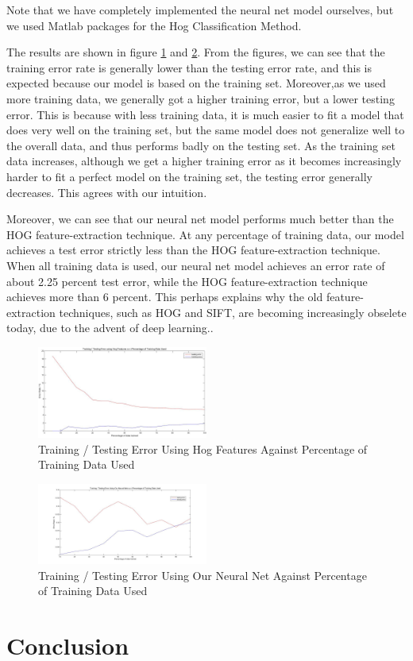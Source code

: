 \documentclass[10pt,twocolumn]{article}
\begin{document}
Note that we have completely implemented the neural net model ourselves, but we used Matlab packages for the Hog Classification Method.

The results are shown in figure \ref{fig:hog} and \ref{fig:neural_net_percentage_data}. From the figures, we can see that the training error rate is generally lower than the testing error rate, and this is expected because our model is based on the training set. Moreover,as we used more training data, we generally got a higher training error, but a lower testing error. This is because with less training data, it is much easier to fit a model that does very well on the training set, but the same model does not generalize well to the overall data, and thus performs badly on the testing set. As the training set data increases, although we get a higher training error as it becomes increasingly harder to fit a perfect model on the training set, the testing error generally decreases. This agrees with our intuition.

Moreover, we can see that our neural net model performs much better than the HOG feature-extraction technique. At any percentage of training data, our model achieves a test error strictly less than the HOG feature-extraction technique. When all training data is used, our neural net model achieves an error rate of about 2.25 percent test error, while the HOG feature-extraction technique achieves more than 6 percent. This perhaps explains why the old feature-extraction techniques, such as HOG and SIFT, are becoming increasingly obselete today, due to the advent of deep learning..

\begin{figure}
\includegraphics[width = 0.5\textwidth]{figure/hog}
\caption{Training / Testing Error Using Hog Features Against Percentage of Training Data Used}
\label{fig:hog}
\end{figure}

\begin{figure}
\includegraphics[width = 0.5\textwidth]{figure/neural_net_percentage_data}
\caption{Training / Testing Error Using Our Neural Net Against Percentage of Training Data Used}
\label{fig:neural_net_percentage_data}
\end{figure}

\section{Conclusion} \label{sec:conclude}


{}

\end{document}
